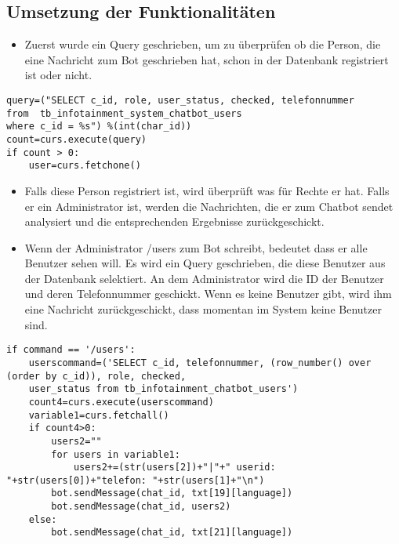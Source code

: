 \subsection{Umsetzung der Funktionalitäten}
\begin{itemize}
	\item Zuerst wurde ein Query geschrieben, um zu überprüfen ob die Person, die eine Nachricht zum Bot geschrieben hat, schon in der Datenbank registriert ist oder nicht. \\
\end{itemize} 
\newpage
\begin{lstlisting}[frame=single]
query=("SELECT c_id, role, user_status, checked, telefonnummer 
from  tb_infotainment_system_chatbot_users 
where c_id = %s") %(int(char_id))
count=curs.execute(query)
if count > 0:
	user=curs.fetchone()
\end{lstlisting}
\begin{itemize}
	\item Falls diese Person registriert ist, wird überprüft was f\"ur Rechte er hat. Falls er ein Administrator ist, werden die Nachrichten, die er zum Chatbot sendet analysiert und die entsprechenden Ergebnisse zurückgeschickt. 
\end{itemize}	
\begin{itemize}
	\item Wenn der Administrator /users zum Bot schreibt, bedeutet dass er alle Benutzer sehen will. Es wird ein Query geschrieben, die diese Benutzer aus der Datenbank selektiert. An dem Administrator wird die ID der Benutzer und deren Telefonnummer geschickt. Wenn es keine Benutzer gibt, wird ihm eine Nachricht zur\"uckgeschickt, dass momentan im System keine Benutzer sind.
\end{itemize}
\begin{lstlisting}[frame=single]
if command == '/users':
	userscommand=('SELECT c_id, telefonnummer, (row_number() over (order by c_id)), role, checked,
	user_status from tb_infotainment_chatbot_users')
	count4=curs.execute(userscommand)
	variable1=curs.fetchall()
	if count4>0:
		users2=""
		for users in variable1:
			users2+=(str(users[2])+"|"+" userid: "+str(users[0])+"telefon: "+str(users[1]+"\n")
		bot.sendMessage(chat_id, txt[19][language])
		bot.sendMessage(chat_id, users2)
	else:
		bot.sendMessage(chat_id, txt[21][language])
	
\end{lstlisting}

